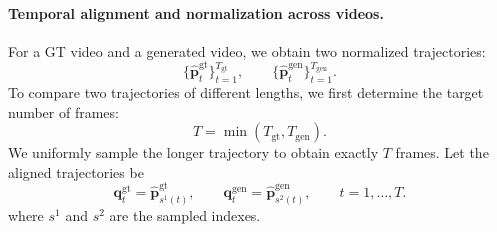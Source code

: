 
\paragraph{Temporal alignment and normalization across videos.}
For a GT video and a generated video, we obtain two normalized trajectories:
\[
    \{\hat{\mathbf{p}}_t^{\text{gt}}\}_{t=1}^{T_{\text{gt}}}, \qquad
    \{\hat{\mathbf{p}}_t^{\text{gen}}\}_{t=1}^{T_{\text{gen}}}.
\]
To compare two trajectories of different lengths, we first determine the target number of frames:
\[
    T = \min(T_{\text{gt}}, T_{\text{gen}}).
\]
We uniformly sample the longer trajectory to obtain exactly \(T\) frames.  
Let the aligned trajectories be
\[
    \mathbf{q}_t^{\text{gt}} = \hat{\mathbf{p}}_{s^1(t)}^{\text{gt}}, 
    \qquad
    \mathbf{q}_t^{\text{gen}} = \hat{\mathbf{p}}_{s^2(t)}^{\text{gen}}, 
    \qquad 
    t = 1,\dots,T.
\]
where $s^1$ and $s^2$ are the sampled indexes.

